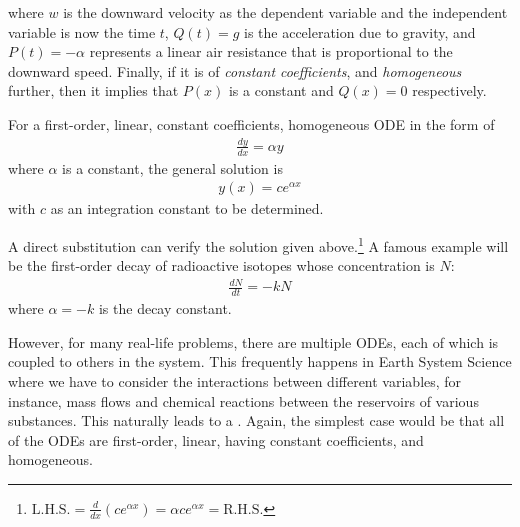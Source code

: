 where $w$ is the downward velocity as the dependent variable and the independent variable is now the time $t$, $Q(t) = g$ is the acceleration due to gravity, and $P(t) = -\alpha$ represents a linear air resistance that is proportional to the downward speed. Finally, if it is of \textit{constant coefficients}, and \textit{homogeneous} further, then it implies that $P(x)$ is a constant and $Q(x) = 0$ respectively.
\begin{proper}
\label{proper:ODEsol}
For a first-order, linear, constant coefficients, homogeneous ODE in the form of
\begin{align}
\frac{dy}{dx} = \alpha y
\end{align}
where $\alpha$ is a constant, the general solution is
\begin{align}
y(x) = ce^{\alpha x}
\end{align}
with $c$ as an integration constant to be determined. 
\end{proper}
A direct substitution can verify the solution given above.\footnote{$\text{L.H.S.} = \frac{d}{dx} (ce^{\alpha x}) = \alpha ce^{\alpha x} = \text{R.H.S.}$} A famous example will be the first-order decay of radioactive isotopes whose concentration is $N$:
\begin{align*}
\frac{dN}{dt} = -kN
\end{align*}
where $\alpha = -k$ is the decay constant.
\par
However, for many real-life problems, there are multiple ODEs, each of which is coupled to others in the system. This frequently happens in Earth System Science where we have to consider the interactions between different variables, for instance, mass flows and chemical reactions between the reservoirs of various substances. This naturally leads to a . Again, the simplest case would be that all of the ODEs are first-order, linear, having constant coefficients, and homogeneous.
